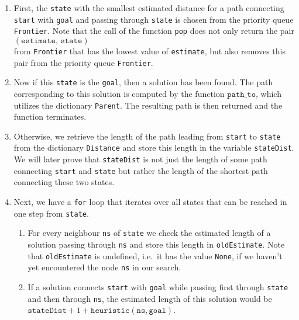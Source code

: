 \begin{enumerate}
\item First, the \texttt{state} with the smallest estimated distance for a path connecting \texttt{start}
      with \texttt{goal} and passing through \texttt{state} is chosen from the priority queue 
      \texttt{Frontier}.  Note that the call of the function \texttt{pop} does not only return the pair
      \\[0.2cm]
      \hspace*{1.3cm}
      $(\mathtt{estimate},\, \mathtt{state})$
      \\[0.2cm]
      from \texttt{Frontier} that has the lowest value of \texttt{estimate}, but also removes this
      pair from the priority queue \texttt{Frontier}.
\item Now if this \texttt{state} is the \texttt{goal}, then a solution has been found.  The path
      corresponding to this solution is computed by the function $\texttt{path\_to}$, which utilizes 
      the dictionary \texttt{Parent}.  The resulting path is then returned and the function terminates.
\item Otherwise, we retrieve the length of the path leading from \texttt{start} to \texttt{state} from the
      dictionary \texttt{Distance} and store this length in the variable \texttt{stateDist}.  We will later
      prove that \texttt{stateDist} is not just the length of some path connecting
      \texttt{start} and \texttt{state} but rather the length of the shortest path connecting these
      two states. 
\item Next, we have a \texttt{for} loop that iterates over all states that can be reached in one step from 
      \texttt{state}.
      \begin{enumerate}
      \item For every neighbour \texttt{ns} of \texttt{state} we check the estimated length of a solution
            passing through \texttt{ns} and store this length in \texttt{oldEstimate}.   Note that
            \texttt{oldEstimate} is undefined, i.e.~it has the value \texttt{None}, if we haven't yet encountered the node
            \texttt{ns} in our search.
      \item If a solution connects \texttt{start} with \texttt{goal} while passing first through
            \texttt{state} and then through \texttt{ns}, the estimated length of this solution would be
            \\[0.2cm]
            \hspace*{1.3cm}
            $\mathtt{stateDist} + 1 + \mathtt{heuristic}(\mathtt{ns}, \mathtt{goal})$.

\end{enumerate}
\end{enumerate}
